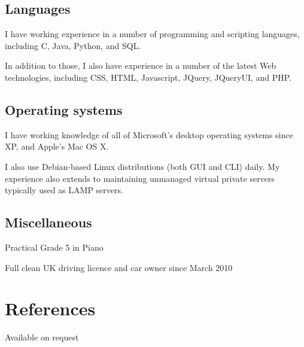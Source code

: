 \documentclass[11pt,a4paper]{article}
\begin{document}
\subsection*{Languages}

I have working experience in a number of programming and scripting languages,
including C, Java, Python, and SQL.

In addition to those, I also have experience in a number of the latest Web
technologies, including CSS, HTML, Javascript, JQuery, JQueryUI, and PHP.

\subsection*{Operating systems}

I have working knowledge of all of Microsoft's desktop operating systems since
XP, and Apple's Mac OS X.

I also use Debian-based Linux distributions (both GUI and CLI) daily. My
experience also extends to maintaining unmanaged virtual private servers
typically used as LAMP servers.

\subsection*{Miscellaneous}

Practical Grade 5 in Piano

Full clean UK driving licence and car owner since March 2010

\section*{References}

Available on request
\end{document}
